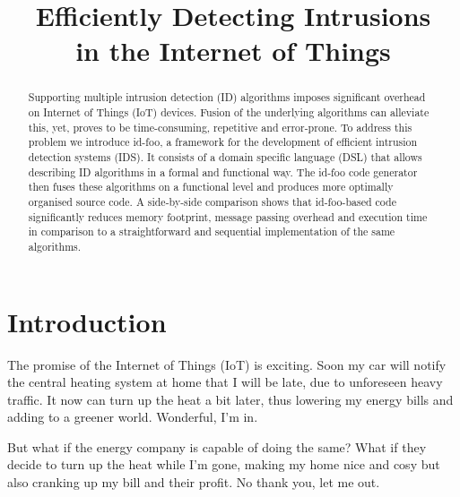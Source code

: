 \documentclass[conference]{IEEEtran}
\begin{document}
\expandafter\def\csname PY@tok@err\endcsname{}

\title{Efficiently Detecting Intrusions\\in the Internet of Things}

\author{%
}

\maketitle

\begin{abstract}

Supporting multiple intrusion detection (ID) algorithms imposes significant
overhead on Internet of Things (IoT) devices. Fusion of the underlying
algorithms can alleviate this, yet, proves to be time-consuming, repetitive and
error-prone. To address this problem we introduce id-foo, a framework for the
development of efficient intrusion detection systems (IDS). It consists of a
domain specific language (DSL) that allows describing ID algorithms in a formal
and functional way. The id-foo code generator then fuses these algorithms on a
functional level and produces more optimally organised source code. A
side-by-side comparison shows that id-foo-based code significantly reduces
memory footprint, message passing overhead and execution time in comparison to
a straightforward and sequential implementation of the same algorithms.

\end{abstract}

\section{Introduction}


The promise of the Internet of Things (IoT) is exciting. Soon my car will
notify the central heating system at home that I will be late, due to
unforeseen heavy traffic. It now can turn up the heat a bit later, thus
lowering my energy bills and adding to a greener world. Wonderful, I'm in.

But what if the energy company is capable of doing the same? What if they
decide to turn up the heat while I'm gone, making my home nice and cosy but
also cranking up my bill and their profit. No thank you, let me out.
\end{document}
